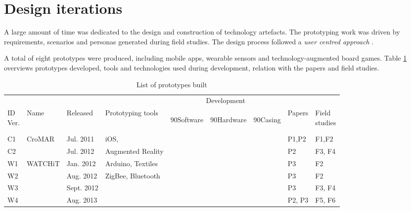 \section{Design iterations}\label{design-iterations}

A large amount of time was dedicated to the design and construction of technology artefacts. The prototyping work was driven by requirements, scenarios and personas generated during field studies. The design process followed a \emph{user centred approach} \autocites{MAGUIRE:2001dp}{Gulliksen:2003hd}.

A total of eight prototypes were produced, including mobile apps, wearable sensors and technology-augmented board games. Table \ref{prototypes} overviews prototypes developed, tools and technologies used during development, relation with the papers and field studies.
\begin{table}
	[!p] \centering \caption{List of prototypes built} \label{prototypes} 
	\begin{threeparttable}
		\begin{tabular}
			{@{}lllllllll@{}} \toprule & & & & \multicolumn{3}{c}{Development} & & \\
			\cline{5-7} \noalign{\smallskip} \specialcell[b]{ID\\Ver.} & Name & Released & Prototyping tools & 
			\begin{turn}
				{90}Software
			\end{turn}
			& 
			\begin{turn}
				{90}Hardware
			\end{turn}
			& 
			\begin{turn}
				{90}Casing
			\end{turn}
			& Papers & \specialcell[b]{Field\\studies} \\
			\midrule \noalign{\smallskip} C1 & CroMAR & Jul. 2011 & iOS, & \textbullet & & & P1,P2 & F1,F2 \\
			C2 & & Jul. 2012 & Augmented Reality & \textbullet & & & P2 & F3, F4 \\
			\hline \noalign{\smallskip} W1 & WATCHiT & Jan. 2012 & Arduino, Textiles & \textbullet & \textbullet & & P3 & F2 \\
			W2 & & Aug. 2012 & ZigBee, Bluetooth & \textbullet & \textbullet & & P3 & F2 \\
			W3 & & Sept. 2012 & & \textbullet & \textbullet & & P3 & F3, F4 \\
			W4 & & Aug. 2013 & & \textbullet & \textbullet & \textbullet & P2, P3 & F5, F6 \\

\end{tabular}
\end{threeparttable}
\end{table}
